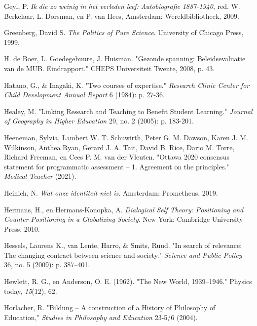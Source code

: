 \documentclass[smallauthor, chapterhaspagenum, nochapterinheader, pagenuminheader,  bigchapnum,medium2, tocpages,  garamond, titleinheader]{jote-book}
\begin{document}
\begin{references}
		Geyl, P. \emph{Ik}\emph{ die zo }\emph{weinig}\emph{ in het }\emph{verleden}\emph{ }\emph{leef}\emph{: }\emph{Autobiografie}\emph{ 1887-1940}, red. W. Berkelaar, L. Dorsman, en P. van Hees, Amsterdam: Wereldbibliotheek, 2009.



		Greenberg, David S. \emph{The Politics of Pure Science}. University of Chicago Press, 1999.



		H. de Boer, L. Goedegebuure, J. Huisman. "Gezonde spanning: Beleidsevaluatie van de MUB. Eindrapport." CHEPS Universiteit Twente, 2008, p. 43.



		Hatano, G., \& Inagaki, K. "Two courses of expertise." \emph{Research Clinic Center for Child Development Annual Report} 6 (1984): p. 27-36.



		Healey, M. "Linking Research and Teaching to Benefit Student Learning." \emph{Journal of Geography in Higher Education} 29, no. 2 (2005): p. 183-201.



		Heeneman, Sylvia, Lambert W. T. Schuwirth, Peter G. M. Dawson, Karen J. M. Wilkinson, Anthea Ryan, Gerard J. A. Tait, David B. Rice, Dario M. Torre, Richard Freeman, en Cees P. M. van der Vleuten. "Ottawa 2020 consensus statement for programmatic assessment -- 1. Agreement on the principles." \emph{Medical Teacher} (2021).



		Heinich, N. \emph{Wat }\emph{onze}\emph{ }\emph{identiteit}\emph{ }\emph{niet}\emph{ is}. Amsterdam: Prometheus, 2019.



		Hermans, H., en Hermans-Konopka, A. \emph{Dialogical Self Theory: Positioning and Counter-Positioning in a Globalizing Society}. New York: Cambridge University Press, 2010.



		Hessels, Laurens K., van Lente, Harro, \& Smits, Ruud. "In search of relevance: The changing contract between science and society." \emph{Science and Public Policy} 36, no. 5 (2009): p. 387--401.



		Hewlett, R. G., en Anderson, O. E. (1962). "The New World, 1939--1946." Physics today, \emph{15}(12), 62.



		Horlacher, R. "Bildung -- A construction of a History of Philosophy of Education," \emph{Studies in Philosophy and Education} 23-5/6 (2004).




\end{references}
\end{document}
